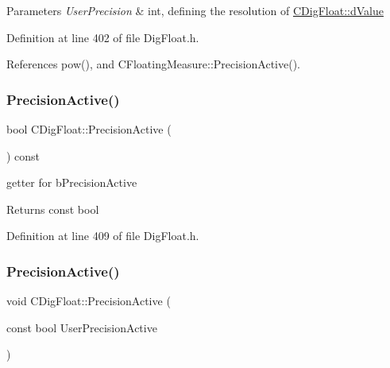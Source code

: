 \begin{DoxyParams}{Parameters}
{\em User\+Precision} & int, defining the resolution of \hyperlink{classCDigFloat_a4bbe69e30dd4e20527362493aa9aaf96}{C\+Dig\+Float\+::d\+Value} \\
\hline
\end{DoxyParams}


Definition at line 402 of file Dig\+Float.\+h.



References pow(), and C\+Floating\+Measure\+::\+Precision\+Active().

\mbox{\label{classCDigFloat_ad1f2365630c9e35e77c01093e73440c4}} 
\subsubsection{\texorpdfstring{Precision\+Active()}{PrecisionActive()}\hspace{0.1cm}{\footnotesize\ttfamily [1/2]}}
{\footnotesize\ttfamily bool C\+Dig\+Float\+::\+Precision\+Active (\begin{DoxyParamCaption}{ }\end{DoxyParamCaption}) const\hspace{0.3cm}{\ttfamily [inline]}}



getter for b\+Precision\+Active 

\begin{DoxyReturn}{Returns}
const bool 
\end{DoxyReturn}


Definition at line 409 of file Dig\+Float.\+h.

\mbox{\label{classCDigFloat_a680354bead4079c14a67688124bb4b85}} 
\subsubsection{\texorpdfstring{Precision\+Active()}{PrecisionActive()}\hspace{0.1cm}{\footnotesize\ttfamily [2/2]}}
{\footnotesize\ttfamily void C\+Dig\+Float\+::\+Precision\+Active (\begin{DoxyParamCaption}\item[{const bool}]{User\+Precision\+Active }\end{DoxyParamCaption})\hspace{0.3cm}{\ttfamily [inline]}}



